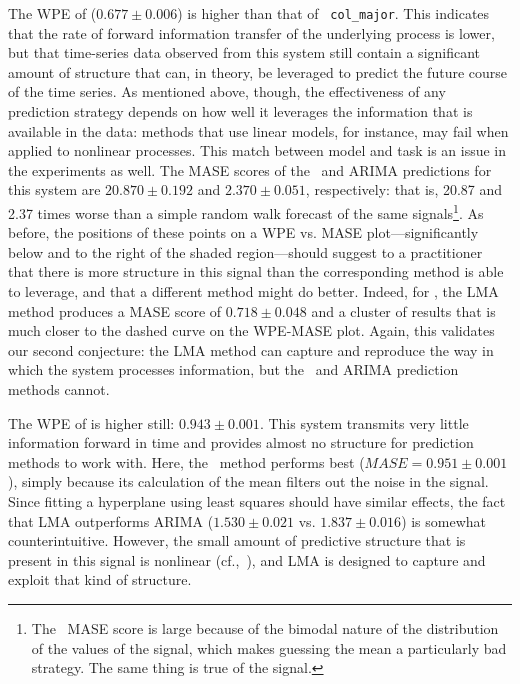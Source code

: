 The WPE of \svdfive ($0.677 \pm 0.006$) is higher than that of {\tt
  col\_major}.  This indicates that the rate of forward information
transfer of the underlying process is lower, but that time-series data
observed from this system still contain a significant amount of
structure that can, in theory, be leveraged to predict the future
course of the time series.  As mentioned above, though, the
effectiveness of any prediction strategy depends on how well it
leverages the information that is available in the data: methods that
use linear models, for instance, may fail when applied to nonlinear
processes.
%
%
This match between model and task is an issue in the \svdfive
experiments as well.  The MASE scores of the \naive ~and ARIMA
predictions for this system are $20.870 \pm 0.192$ and $2.370 \pm
0.051$, respectively: that is, 20.87 and 2.37 times worse than a
simple random walk forecast of the same signals\footnote{The \naive
  ~MASE score is large because of the bimodal nature of the
  distribution of the values of the signal, which makes guessing the
  mean a particularly bad strategy.  The same thing is true of the
  \svdthree signal.}.  As before, the positions of these points on a
WPE vs. MASE plot---significantly below and to the right of the shaded
region---should suggest to a practitioner that there is more structure
in this signal than the corresponding method is able to leverage, and
that a different method might do better.  Indeed, for \svdfive, the
LMA method produces a MASE score of $ 0.718\pm 0.048 $ and a cluster
of results that is much closer to the dashed curve on the WPE-MASE
plot.  Again, this validates our second conjecture: the LMA method can
capture and reproduce the way in which the \svdfive system processes
information, but the \naive ~and ARIMA prediction methods cannot.

The WPE of \gcc is higher still: $0.943 \pm 0.001$.  This system
transmits very little information forward in time and provides almost
no structure for prediction methods to work with.  Here, the \naive
~method performs best ($MASE=0.951 \pm 0.001$), simply because its
calculation of the mean filters out the noise in the signal.  Since
fitting a hyperplane using least squares should have similar effects,
the fact that LMA outperforms ARIMA ($1.530 \pm 0.021$ vs. $1.837 \pm
0.016$) is somewhat counterintuitive.  However, the small amount of
predictive structure that is present in this signal is nonlinear
(cf.,~\cite{mytkowicz09}), and LMA is designed to capture and exploit
that kind of structure.

